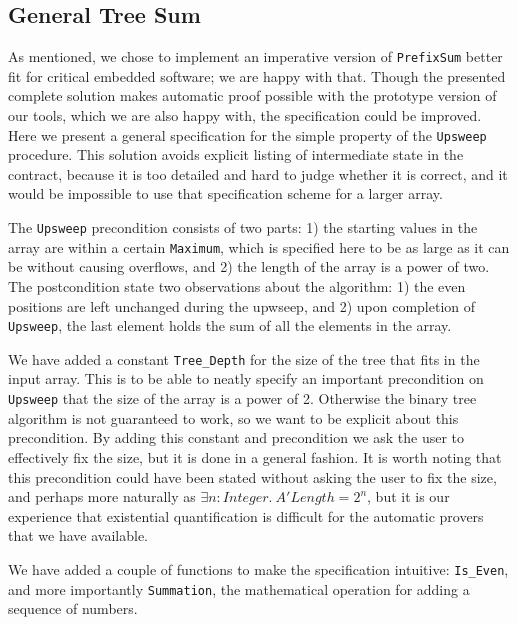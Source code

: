 \documentclass[sttt,draft]{svjour}
\begin{document}
\subsection{General  Tree Sum}
As mentioned, we chose to implement an imperative version of
\verb|PrefixSum| better fit for critical embedded software; we are happy
with that. Though the presented complete solution makes automatic
proof possible with the prototype version of our tools, which we are
also happy with, the specification could be improved. Here we present
a general specification for the simple property of the \verb|Upsweep|
procedure. This solution avoids explicit listing of intermediate state in the
contract, because it is too detailed and hard to judge whether it is
correct, and it would be impossible to use that specification scheme
for a larger array.

The \verb|Upsweep| precondition consists of two parts: 1) the starting
values in the array are within a certain \verb|Maximum|, which is
specified here to be as large as it can be without causing overflows,
and 2) the length of the array is a power of two. The postcondition
state two observations about the algorithm: 1) the even positions are
left unchanged during the upwseep, and 2) upon completion of
\verb|Upsweep|, the last element holds the sum of all the elements in
the array.

We have added a constant \verb|Tree_Depth| for the size of the tree
that fits in the input array. This is to be able to neatly specify an
important precondition on \verb|Upsweep| that the size of the array is
a power of 2. Otherwise the binary tree algorithm is not guaranteed to
work, so we want to be explicit about this precondition. By adding
this constant and precondition we ask the user to effectively fix the
size, but it is done in a general fashion. It is worth noting that
this precondition could have been stated without asking the user to fix
the size, and perhaps more naturally as $\exists n: \mathit{Integer}.~ A'\mathit{Length} = 2^n$, but it is our experience that existential quantification is
difficult for the automatic provers that we have available.

We have added a couple of functions to make the specification
intuitive: \verb|Is_Even|, and more importantly \verb|Summation|, the
mathematical operation for adding a sequence of numbers.
\end{document}
